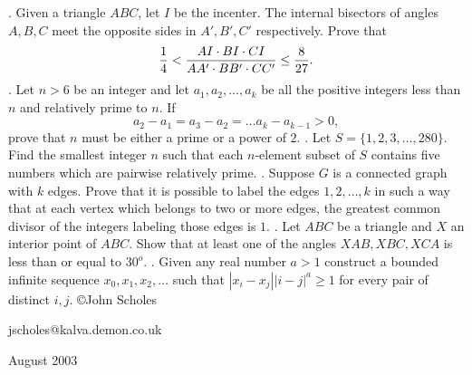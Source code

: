 \nopagenumbers
{}
\vskip 25pt
. Given a triangle $ABC$, let $I$ be the incenter. The internal bisectors of angles $A,B,C$ meet the opposite sides in $A',B',C'$ respectively. Prove that $${1\over4}<{AI\cdot BI\cdot CI\over AA'\cdot BB'\cdot CC'}\le {8\over27}.$$
\vskip 12pt
. Let $n>6$ be an integer and let $a_1,a_2,\ldots ,a_k$ be all the positive integers less than $n$ and relatively prime to $n$. If $$a_2-a_1=a_3-a_2=\ldots a_k-a_{k-1}>0,$$ prove that $n$ must be either a prime or a power of $2$.
\vskip 12pt
. Let $S=\{1,2,3,\ldots ,280\}$. Find the smallest integer $n$ such that each $n$-element subset of $S$ contains five numbers which are pairwise relatively prime.
\vskip 12pt
. Suppose $G$ is a connected graph with $k$ edges. Prove that it is possible to label the edges $1,2,\ldots ,k$ in such a way that at each vertex which belongs to two or more edges, the greatest common divisor of the integers labeling those edges is $1$.
\vskip 12pt
. Let $ABC$ be a triangle and $X$ an interior point of $ABC$. Show that at least one of the angles $XAB,XBC,XCA$ is less than or equal to $30^o$.
\vskip 12pt
. Given any real number $a>1$ construct a bounded infinite sequence $x_0,x_1,x_2,\ldots$ such that $|x_i-x_j||i-j|^a\ge 1$ for every pair of distinct $i,j$.
\vskip 20pt
\noindent \copyright John Scholes

\noindent jscholes@kalva.demon.co.uk

 August 2003

\bye
